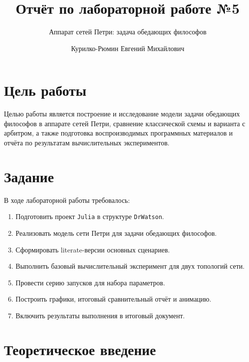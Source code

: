 \documentclass[
  12pt,
  a4paper,
  DIV=11,
  numbers=noendperiod]{scrreprt}
\title{Отчёт по лабораторной работе №5}
\subtitle{Аппарат сетей Петри: задача обедающих философов}
\author{Курилко-Рюмин Евгений Михайлович}
\date{}
\providecommand{\tightlist}{%
  \setlength{\itemsep}{0pt}\setlength{\parskip}{0pt}}\usepackage{longtable,booktabs,array}
\renewcommand*\contentsname{Содержание}
\newcommand\contentsname{Содержание}
\begin{document}
\maketitle

\renewcommand*\contentsname{Содержание}
{
\setcounter{tocdepth}{1}
\tableofcontents
}
\listoffigures
\listoftables

\chapter{Цель
работы}\label{ux446ux435ux43bux44c-ux440ux430ux431ux43eux442ux44b}

Целью работы является построение и исследование модели задачи обедающих
философов в аппарате сетей Петри, сравнение классической схемы и
варианта с арбитром, а также подготовка воспроизводимых программных
материалов и отчёта по результатам вычислительных экспериментов.

\chapter{Задание}\label{ux437ux430ux434ux430ux43dux438ux435}

В ходе лабораторной работы требовалось:

\begin{enumerate}
\def\labelenumi{\arabic{enumi}.}
\tightlist
\item
  Подготовить проект \texttt{Julia} в структуре \texttt{DrWatson}.
\item
  Реализовать модель сети Петри для задачи обедающих философов.
\item
  Сформировать literate-версии основных сценариев.
\item
  Выполнить базовый вычислительный эксперимент для двух топологий сети.
\item
  Провести серию запусков для набора параметров.
\item
  Построить графики, итоговый сравнительный отчёт и анимацию.
\item
  Включить результаты выполнения в итоговый документ.
\end{enumerate}

\chapter{Теоретическое
введение}\label{ux442ux435ux43eux440ux435ux442ux438ux447ux435ux441ux43aux43eux435-ux432ux432ux435ux434ux435ux43dux438ux435}
\end{document}
